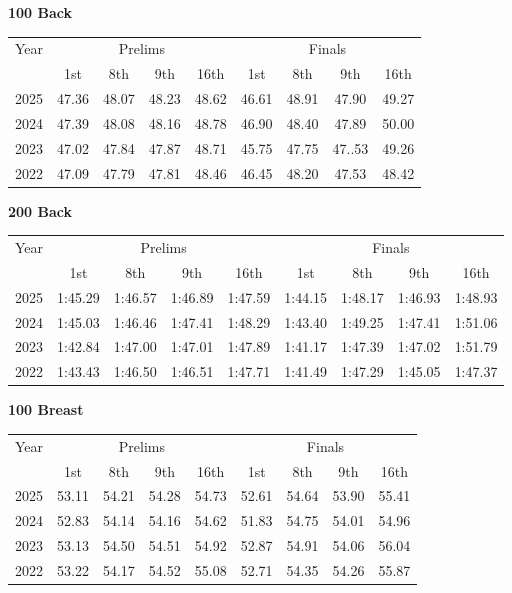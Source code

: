 \textbf{100 Back}

\begin{flushleft}
\begin{tabular}{|c|c|c|c|c|c|c|c|c|}
\hline
Year & \multicolumn{4}{c|}{Prelims} & \multicolumn{4}{c|}{Finals} \\
\cline{2-9}
& 1st & 8th & 9th & 16th & 1st & 8th & 9th & 16th \\
\hline
2025 & 47.36 & 48.07 & 48.23 & 48.62 & 46.61 & 48.91 & 47.90 & 49.27 \\
2024 & 47.39 & 48.08 & 48.16 & 48.78 & 46.90 & 48.40 & 47.89 & 50.00 \\
2023 & 47.02 & 47.84 & 47.87 & 48.71 & 45.75 & 47.75 & 47..53 & 49.26 \\
2022 & 47.09 & 47.79 & 47.81 & 48.46 & 46.45 & 48.20 & 47.53 & 48.42 \\
\hline
\end{tabular}
\end{flushleft}

\clearpage
\textbf{200 Back}

\begin{flushleft}
\begin{tabular}{|c|c|c|c|c|c|c|c|c|}
\hline
Year & \multicolumn{4}{c|}{Prelims} & \multicolumn{4}{c|}{Finals} \\
\cline{2-9}
& 1st & 8th & 9th & 16th & 1st & 8th & 9th & 16th \\
\hline
2025 & 1:45.29 & 1:46.57 & 1:46.89 & 1:47.59 & 1:44.15 & 1:48.17 & 1:46.93 & 1:48.93 \\
2024 & 1:45.03 & 1:46.46 & 1:47.41 & 1:48.29 & 1:43.40 & 1:49.25 & 1:47.41 & 1:51.06 \\
2023 & 1:42.84 & 1:47.00 & 1:47.01 & 1:47.89 & 1:41.17 & 1:47.39 & 1:47.02 & 1:51.79 \\
2022 & 1:43.43 & 1:46.50 & 1:46.51 & 1:47.71 & 1:41.49 & 1:47.29 & 1:45.05 & 1:47.37 \\
\hline
\end{tabular}
\end{flushleft}

\textbf{100 Breast}

\begin{flushleft}
\begin{tabular}{|c|c|c|c|c|c|c|c|c|}
\hline
Year & \multicolumn{4}{c|}{Prelims} & \multicolumn{4}{c|}{Finals} \\
\cline{2-9}
& 1st & 8th & 9th & 16th & 1st & 8th & 9th & 16th \\
\hline
2025 & 53.11 & 54.21 & 54.28 & 54.73 & 52.61 & 54.64 & 53.90 & 55.41 \\
2024 & 52.83 & 54.14 & 54.16 & 54.62 & 51.83 & 54.75 & 54.01 & 54.96 \\
2023 & 53.13 & 54.50 & 54.51 & 54.92 & 52.87 & 54.91 & 54.06 & 56.04 \\
2022 & 53.22 & 54.17 & 54.52 & 55.08 & 52.71 & 54.35 & 54.26 & 55.87 \\
\hline
\end{tabular}
\end{flushleft}

